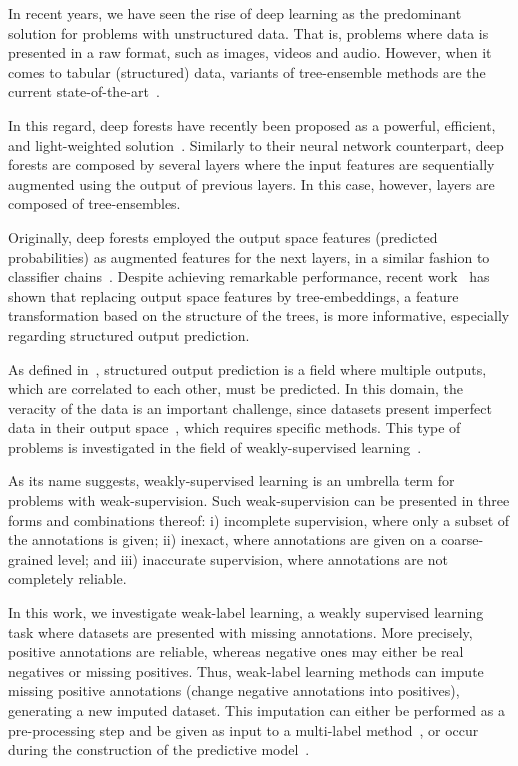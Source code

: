 \documentclass[conference,compsoc]{IEEEtran}
\begin{document}
In recent years, we have seen the rise of deep learning as the predominant solution for problems with unstructured data. That is, problems where data is presented in a raw format, such as images, videos and audio. However, when it comes to tabular (structured) data, variants of tree-ensemble methods are the current state-of-the-art~\cite{grinsztajn2022tree}.

In this regard, deep forests have recently been proposed as a powerful, efficient, and light-weighted solution~\cite{zhou2019deep}. Similarly to their neural network counterpart, deep forests are composed by several layers where the input features are sequentially augmented using the output of previous layers. In this case, however, layers are composed of tree-ensembles.

Originally, deep forests employed the output space features (predicted probabilities) as augmented features for the next layers, in a similar fashion to classifier chains~\cite{read2021classifier}. Despite achieving remarkable performance, recent work~\cite{nakano2022deep} has shown that replacing output space features by tree-embeddings, a feature transformation based on the structure of the trees, is more informative, especially regarding structured output prediction.   

As defined in~\cite{xu2019survey, waegeman2019multi}, structured output prediction is a field where multiple outputs, which are correlated to each other, must be predicted. In this domain, the veracity of the data is an important challenge, since datasets present imperfect data in their output space~\cite{xu2019survey}, which requires specific methods. This type of problems is investigated in the field of weakly-supervised learning~\cite{zhou2018brief}.

As its name suggests, weakly-supervised learning is an umbrella term for problems with weak-supervision. Such weak-supervision can be presented in three forms and combinations thereof: i) incomplete supervision, where only a subset of the annotations is given; ii) inexact, where annotations are given on a coarse-grained level; and iii) inaccurate supervision, where annotations are not completely reliable.

In this work, we investigate weak-label learning, a weakly supervised learning task where datasets are presented with missing annotations. More precisely, positive annotations are reliable, whereas negative ones may either be real negatives or missing positives. Thus, weak-label learning methods can impute missing positive annotations (change negative annotations into positives), generating a new imputed dataset. This imputation can either be performed as a pre-processing step and be given as input to a multi-label method~\cite{sun2010multi}, or occur during the construction of the predictive model~\cite{wang2020learning}.    
\end{document}
